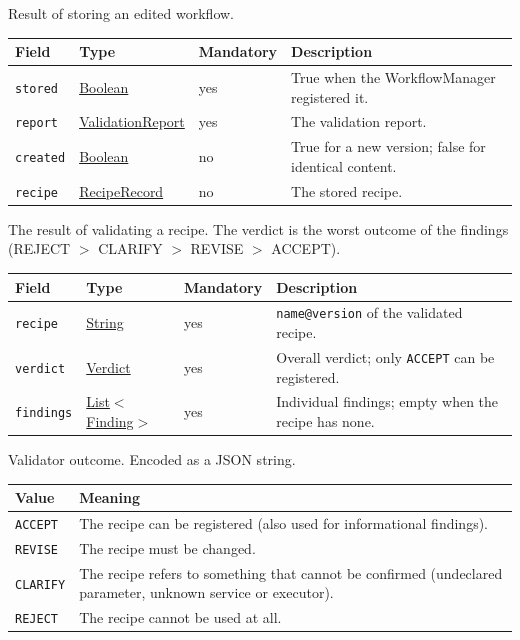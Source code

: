 \documentclass[a4paper]{arrowhead}
\newcommand{\mref}[1]{{\textcolor{ArrowheadPurple}{\hyperref[sec:model:#1]{#1}}}}
\newcommand{\pref}[1]{{\textcolor{ArrowheadGrey}{\hyperref[sec:model:primitives:#1]{#1}}}}
\begin{document}
Result of storing an edited workflow.

{\small
\begin{longtable}{|p{3.7cm}|p{4.2cm}|p{1.6cm}|p{6.3cm}|}

\hline
\rowcolor{gray!33} Field & Type & Mandatory & Description \\ \hline
\endhead
\texttt{stored} & \pref{Boolean} & yes & True when the WorkflowManager registered it. \\ \hline
\texttt{report} & \mref{ValidationReport} & yes & The validation report. \\ \hline
\texttt{created} & \pref{Boolean} & no & True for a new version; false for identical content. \\ \hline
\texttt{recipe} & \mref{RecipeRecord} & no & The stored recipe. \\ \hline
\end{longtable}
}

The result of validating a recipe. The verdict is the worst outcome of the findings (REJECT $>$ CLARIFY $>$ REVISE $>$ ACCEPT).

{\small
\begin{longtable}{|p{3.7cm}|p{4.2cm}|p{1.6cm}|p{6.3cm}|}

\hline
\rowcolor{gray!33} Field & Type & Mandatory & Description \\ \hline
\endhead
\texttt{recipe} & \pref{String} & yes & \texttt{name@version} of the validated recipe. \\ \hline
\texttt{verdict} & \mref{Verdict} & yes & Overall verdict; only \texttt{ACCEPT} can be registered. \\ \hline
\texttt{findings} & \pref{List}$<$\mref{Finding}$>$ & yes & Individual findings; empty when the recipe has none. \\ \hline
\end{longtable}
}

Validator outcome.
 Encoded as a JSON string.
{\small
\begin{longtable}{|p{3.9cm}|p{11.9cm}|}

\hline
\rowcolor{gray!33} Value & Meaning \\ \hline
\endhead
\texttt{ACCEPT} & The recipe can be registered (also used for informational findings). \\ \hline
\texttt{REVISE} & The recipe must be changed. \\ \hline
\texttt{CLARIFY} & The recipe refers to something that cannot be confirmed (undeclared parameter, unknown service or executor). \\ \hline
\texttt{REJECT} & The recipe cannot be used at all. \\ \hline
\end{longtable}
}
\end{document}
